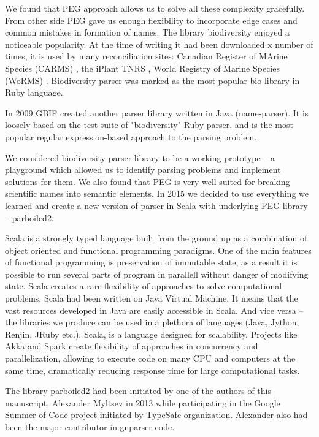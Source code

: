 \documentclass{bmcart}
\begin{document}
We found that PEG approach allows us to solve all these complexity gracefully.
From other side PEG gave us enough flexibility to incorporate edge cases and
common mistakes in formation of names. The library biodiversity enjoyed a
noticeable popularity. At the time of writing it had been downloaded x number
of times, it is used by many reconciliation sites: Canadian Register of MArine
Species (CARMS) \cite{carms}, the iPlant TNRS \cite{iplant}, World Registry of
Marine Species (WoRMS) \cite{worms}.  Biodiversity parser was marked as the
most popular bio-library in Ruby language.

In 2009 GBIF created another parser library written in Java (name-parser). It
is loosely based on the test suite of "biodiversity" Ruby parser, and is the
most popular regular expression-based approach to the parsing problem.

We considered biodiversity parser library to be a working prototype -- a
playground which allowed us to identify parsing problems and implement
solutions for them. We also found that PEG is very well suited for breaking
scientific names into semantic elements. In 2015 we decided to use everything
we learned and create a new version of parser in Scala with underlying PEG
library -- parboiled2.

Scala is a strongly typed language built from the ground up as a combination of
object oriented and functional programming paradigms. One of the main features
of functional programming is preservation of immutable state, as a result it is
possible to run several parts of program in parallell without danger of
modifying state. Scala creates a rare flexibility of approaches to solve
computational problems. Scala had been written on Java Virtual Machine. It
means that the vast resources developed in Java are easily accessible in Scala.
And vice versa -- the libraries we produce can be used in a plethora of
languages (Java, Jython, Renjin, JRuby etc.). Scala, is a language designed for
scalability. Projects like Akka and Spark create flexibility of approaches in
concurrency and parallelization, allowing to execute code on many CPU and
computers at the same time, dramatically reducing response time for large
computational tasks.

The library parboiled2 had been initiated by one of the authors of this
manuscript, Alexander Myltsev in 2013 while participating in the Google Summer
of Code project initiated by TypeSafe organization. Alexander also had been the
major contributor in gnparser code.
\end{document}
